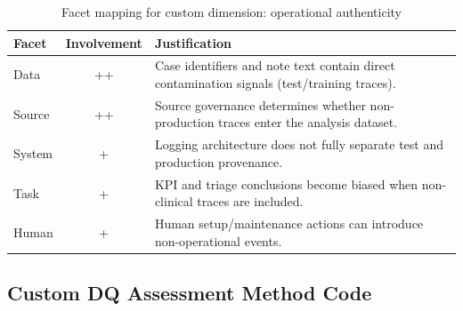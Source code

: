 \begin{table}[H]
\centering
\small
\caption{Facet mapping for custom dimension: operational authenticity}
\label{tab:d5_custom_facet_mapping}
\begin{tabularx}{\textwidth}{l c X}
\toprule
Facet & Involvement & Justification \\
\midrule
Data & ++ & Case identifiers and note text contain direct contamination signals (test/training traces). \\
Source & ++ & Source governance determines whether non-production traces enter the analysis dataset. \\
System & + & Logging architecture does not fully separate test and production provenance. \\
Task & + & KPI and triage conclusions become biased when non-clinical traces are included. \\
Human & + & Human setup/maintenance actions can introduce non-operational events. \\
\bottomrule
\end{tabularx}
\end{table}

\subsection{Custom DQ Assessment Method Code}
\label{app:d5_custom_code}

